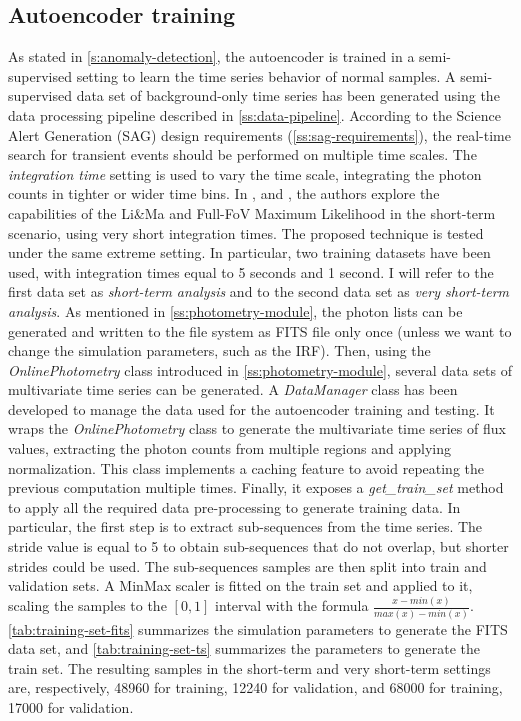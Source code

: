 \subsection{Autoencoder training}
\label{ss:training}
As stated in \autoref{s:anomaly-detection}, the autoencoder is trained in a semi-supervised setting to learn the time series behavior of normal samples. A semi-supervised data set of background-only time series has been generated using the data processing pipeline described in \autoref{ss:data-pipeline}. According to the Science Alert Generation (SAG) design requirements (\autoref{ss:sag-requirements}), the real-time search for transient events should be performed on multiple time scales. The \textit{integration time} setting is used to vary the time scale, integrating the photon counts in tighter or wider time bins. In \cite{tampieri2020real}, and \cite{di2021detection}, the authors explore the capabilities of the Li\&Ma and Full-FoV Maximum Likelihood in the short-term scenario, using very short integration times. The proposed technique is tested under the same extreme setting. In particular, two training datasets have been used, with integration times equal to 5 seconds and 1 second. I will refer to the first data set as \textit{short-term analysis} and to the second data set as \textit{very short-term analysis}. As mentioned in \autoref{ss:photometry-module}, the photon lists can be generated and written to the file system as FITS file only once (unless we want to change the simulation parameters, such as the IRF). Then, using the \textit{OnlinePhotometry} class introduced in \autoref{ss:photometry-module}, several data sets of multivariate time series can be generated. A \textit{DataManager} class has been developed to manage the data used for the autoencoder training and testing. It wraps the \textit{OnlinePhotometry} class to generate the multivariate time series of flux values, extracting the photon counts from multiple regions and applying normalization. This class implements a caching feature to avoid repeating the previous computation multiple times. Finally, it exposes a \textit{get\_train\_set} method to apply all the required data pre-processing to generate training data. In particular, the first step is to extract sub-sequences from the time series. The stride value is equal to 5 to obtain sub-sequences that do not overlap, but shorter strides could be used. The sub-sequences samples are then split into train and validation sets. A MinMax scaler is fitted on the train set and applied to it, scaling the samples to the $[0, 1]$ interval with the formula $ \frac{x-min(x)}{max(x)-min(x)}$. \autoref{tab:training-set-fits} summarizes the simulation parameters to generate the FITS data set, and \autoref{tab:training-set-ts} summarizes the parameters to generate the train set. The resulting samples in the short-term and very short-term settings are, respectively, 48960 for training, 12240 for validation, and 68000 for training, 17000 for validation. 
